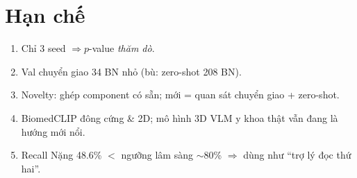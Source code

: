 \documentclass[12pt,a4paper]{article}
\begin{document}
\section{Hạn chế}
\begin{enumerate}[leftmargin=1.5em,itemsep=2pt]
\item Chỉ 3 seed $\Rightarrow p$-value \emph{thăm dò}.
\item Val chuyển giao 34 BN nhỏ (bù: zero-shot 208 BN).
\item Novelty: ghép component có sẵn; mới = quan sát chuyển giao + zero-shot.
\item BiomedCLIP đông cứng \& 2D; mô hình 3D VLM y khoa thật vẫn đang là hướng mới nổi.
\item Recall Nặng 48.6\% $<$ ngưỡng lâm sàng $\sim$80\% $\Rightarrow$ dùng như ``trợ lý đọc thứ hai''.
\end{enumerate}

\end{document}
